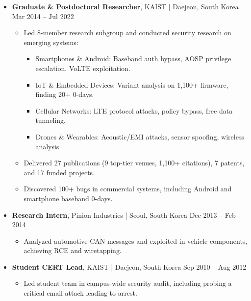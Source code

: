 \documentclass[11pt,letterpaper]{article}
\newcommand{\jobtitle}[1]{\textbf{#1}}
\newcommand{\location}[1]{\textcolor{secondary}{\small #1}}
\newcommand{\daterange}[1]{\textcolor{secondary}{\small #1}}
\begin{document}
\begin{itemize}
\item \jobtitle{Graduate \& Postdoctoral Researcher}, \location{KAIST | Daejeon, South Korea} \hfill \daterange{Mar 2014 -- Jul 2022}
    \begin{itemize}[] %
    \item Led 8-member research subgroup and conducted security research on emerging systems:
        \begin{itemize}[]
        \item Smartphones \& Android: Baseband auth bypass, AOSP privilege escalation, VoLTE exploitation.
        \item IoT \& Embedded Devices: Variant analysis on 1,100+ firmware, finding 20+ 0-days.
        \item Cellular Networks: LTE protocol attacks, policy bypass, free data tunneling.
        \item Drones \& Wearables: Acoustic/EMI attacks, sensor spoofing, wireless analysis.
        \end{itemize}
    \item Delivered 27 publications (9 top-tier venues, 1,100+ citations), 7 patents, and 17 funded projects.
    \item Discovered 100+ bugs in commercial systems, including Android and smartphone baseband 0-days.
    \end{itemize}

\item \jobtitle{Research Intern}, \location{Pinion Industries | Seoul, South Korea} \hfill \daterange{Dec 2013 -- Feb 2014}
    \begin{itemize}[] %
    \item Analyzed automotive CAN messages and exploited in-vehicle components, achieving RCE and wiretapping.
    \end{itemize}

\item \jobtitle{Student CERT Lead}, \location{KAIST | Daejeon, South Korea} \hfill \daterange{Sep 2010 -- Aug 2012}
    \begin{itemize}[] %
    \item Led student team in campus-wide security audit, including probing a critical email attack leading to arrest.
    \end{itemize}
\end{itemize}

\end{document}
